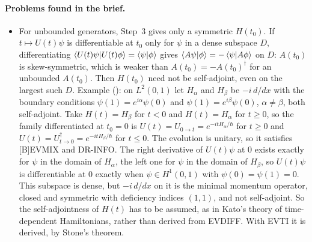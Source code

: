 \documentclass[11pt]{article}
\begin{document}
\paragraph{Problems found in the brief.}
\begin{itemize}
\item For unbounded generators, Step~3 gives only a symmetric $H(t_0)$. If $t \mapsto U(t)\psi$
  is differentiable at $t_0$ only for $\psi$ in a dense subspace $D$, differentiating
  $\braket{U(t)\psi|U(t)\phi} = \braket{\psi|\phi}$ gives $\braket{A\psi|\phi} =
  -\braket{\psi|A\phi}$ on $D$: $A(t_0)$ is skew-symmetric, which is weaker than
  $A(t_0) = -A(t_0)^\dagger$ for an unbounded $A(t_0)$. Then $H(t_0)$ need not be self-adjoint,
  even on the largest such $D$. Example (): on
  $L^2(0,1)$ let $H_\alpha$ and
  $H_\beta$ be $-i\,d/dx$ with the boundary conditions $\psi(1) = e^{i\alpha}\psi(0)$ and
  $\psi(1) = e^{i\beta}\psi(0)$, $\alpha \ne \beta$, both self-adjoint. Take
  $H(t) = H_\beta$ for $t < 0$ and $H(t) = H_\alpha$ for $t \ge 0$, so the family
  differentiated at $t_0 = 0$ is $U(t) = U_{0\to t} = e^{-itH_\alpha/\hbar}$ for $t \ge 0$ and
  $U(t) = U_{t\to 0}^\dagger = e^{-itH_\beta/\hbar}$ for $t \le 0$.
  The evolution is unitary, so it satisfies [B]EVMIX and DR-INFO. The right derivative of
  $U(t)\psi$ at $0$ exists exactly for $\psi$ in the domain of $H_\alpha$, the left one for
  $\psi$ in the domain of $H_\beta$, so $U(t)\psi$ is differentiable at $0$ exactly when
  $\psi \in H^1(0,1)$ with $\psi(0) = \psi(1) = 0$. This subspace is dense, but $-i\,d/dx$ on it
  is the minimal momentum operator, closed and symmetric with deficiency indices $(1,1)$, and not
  self-adjoint. So the self-adjointness of $H(t)$ has to be assumed, as in Kato's theory of
  time-dependent Hamiltonians, rather than derived from EVDIFF. With EVTI it is derived, by
  Stone's theorem.


\end{itemize}
\end{document}
